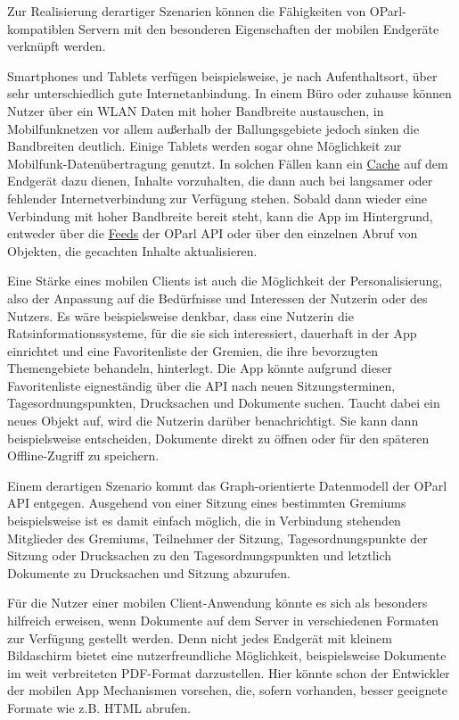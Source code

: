 \documentclass[,a4paper]{article}
\begin{document}
Zur Realisierung derartiger Szenarien können die Fähigkeiten von
OParl-kompatiblen Servern mit den besonderen Eigenschaften der mobilen
Endgeräte verknüpft werden.

Smartphones und Tablets verfügen beispielsweise, je nach Aufenthaltsort,
über sehr unterschiedlich gute Internetanbindung. In einem Büro oder
zuhause können Nutzer über ein WLAN Daten mit hoher Bandbreite
austauschen, in Mobilfunknetzen vor allem außerhalb der Ballungsgebiete
jedoch sinken die Bandbreiten deutlich. Einige Tablets werden sogar ohne
Möglichkeit zur Mobilfunk-Datenübertragung genutzt. In solchen Fällen
kann ein \hyperref[cache]{Cache} auf dem Endgerät dazu dienen, Inhalte
vorzuhalten, die dann auch bei langsamer oder fehlender
Internetverbindung zur Verfügung stehen. Sobald dann wieder eine
Verbindung mit hoher Bandbreite bereit steht, kann die App im
Hintergrund, entweder über die \hyperref[feeds]{Feeds} der OParl API
oder über den einzelnen Abruf von Objekten, die gecachten Inhalte
aktualisieren.

Eine Stärke eines mobilen Clients ist auch die Möglichkeit der
Personalisierung, also der Anpassung auf die Bedürfnisse und Interessen
der Nutzerin oder des Nutzers. Es wäre beispielsweise denkbar, dass eine
Nutzerin die Ratsinformationssysteme, für die sie sich interessiert,
dauerhaft in der App einrichtet und eine Favoritenliste der Gremien, die
ihre bevorzugten Themengebiete behandeln, hinterlegt. Die App könnte
aufgrund dieser Favoritenliste eigneständig über die API nach neuen
Sitzungsterminen, Tagesordnungspunkten, Drucksachen und Dokumente
suchen. Taucht dabei ein neues Objekt auf, wird die Nutzerin darüber
benachrichtigt. Sie kann dann beispielsweise entscheiden, Dokumente
direkt zu öffnen oder für den späteren Offline-Zugriff zu speichern.

Einem derartigen Szenario kommt das Graph-orientierte Datenmodell der
OParl API entgegen. Ausgehend von einer Sitzung eines bestimmten
Gremiums beispielsweise ist es damit einfach möglich, die in Verbindung
stehenden Mitglieder des Gremiums, Teilnehmer der Sitzung,
Tagesordnungspunkte der Sitzung oder Drucksachen zu den
Tagesordnungspunkten und letztlich Dokumente zu Drucksachen und Sitzung
abzurufen.

Für die Nutzer einer mobilen Client-Anwendung könnte es sich als
besonders hilfreich erweisen, wenn Dokumente auf dem Server in
verschiedenen Formaten zur Verfügung gestellt werden. Denn nicht jedes
Endgerät mit kleinem Bildaschirm bietet eine nutzerfreundliche
Möglichkeit, beispielsweise Dokumente im weit verbreiteten PDF-Format
darzustellen. Hier könnte schon der Entwickler der mobilen App
Mechanismen vorsehen, die, sofern vorhanden, besser geeignete Formate
wie z.B. HTML abrufen.
\end{document}
